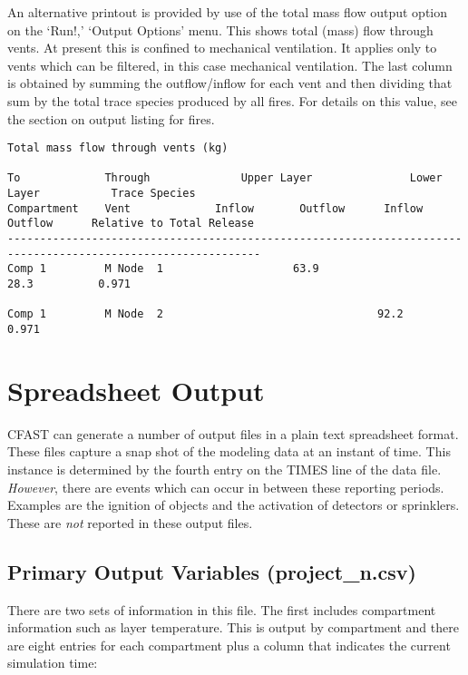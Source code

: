 An alternative printout is provided by use of the total mass flow output option on the `Run!,' `Output Options' menu. This shows total (mass) flow through vents. At present this is confined to mechanical ventilation. It applies only to vents which can be filtered, in this case mechanical ventilation. The last column is obtained by summing the outflow/inflow for each vent and then dividing that sum by the total trace species produced by all fires. For details on this value, see the section on output listing for fires.

\begin{lstlisting}[basicstyle=\tiny]
Total mass flow through vents (kg)

To             Through              Upper Layer               Lower Layer           Trace Species
Compartment    Vent             Inflow       Outflow      Inflow       Outflow      Relative to Total Release
-------------------------------------------------------------------------------------------------------------
Comp 1         M Node  1                    63.9                      28.3          0.971

Comp 1         M Node  2                                 92.2                       0.971
\end{lstlisting}



\section{Spreadsheet Output}

CFAST can generate a number of output files in a plain text spreadsheet format.  These files capture a snap shot of the modeling data at an instant of time. This instance is determined by the fourth entry on the TIMES line of the data file. \emph{However}, there are events which can occur in between these reporting periods. Examples are the ignition of objects and the activation of detectors or sprinklers. These are \emph{not} reported in these output files.

\subsection{Primary Output Variables (project\_n.csv)}

There are two sets of information in this file. The first includes compartment information such as layer temperature. This is output by compartment and there are eight entries for each compartment plus a column that indicates the current simulation time:

